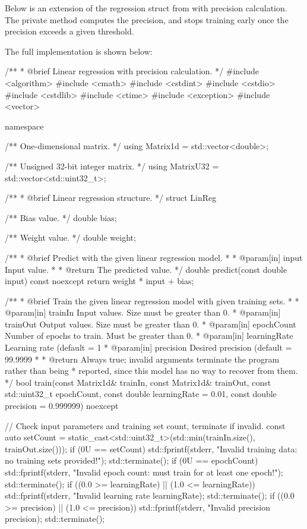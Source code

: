 Below is an extension of the regression struct from  with precision
calculation. The private method  computes the precision, and
 stops training early once the precision exceeds a given threshold.

The full implementation is shown below:

\begin{cppcode}
/**
 * @brief Linear regression with precision calculation.
 */
#include <algorithm>
#include <cmath>
#include <cstdint>
#include <cstdio>
#include <cstdlib>
#include <ctime>
#include <exception>
#include <vector>

namespace
{
/** One-dimensional matrix. */
using Matrix1d = std::vector<double>;

/** Unsigned 32-bit integer matrix. */
using MatrixU32 = std::vector<std::uint32_t>;

/**
 * @brief Linear regression structure.
 */
struct LinReg
{
    /** Bias value. */
    double bias;

    /** Weight value. */
    double weight;

    /**
     * @brief Predict with the given linear regression model.
     *
     * @param[in] input Input value.
     *
     * @return The predicted value.
     */
    double predict(const double input) const noexcept { return weight * input + bias; }

    /**
     * @brief Train the given linear regression model with given training sets.
     *
     * @param[in] trainIn    Input values. Size must be greater than 0.
     * @param[in] trainOut   Output values. Size must be greater than 0.
     * @param[in] epochCount Number of epochs to train. Must be greater than 0.
     * @param[in] learningRate Learning rate (default = 1 %
     * @param[in] precision  Desired precision (default = 99.9999 %
     *
     * @return Always true; invalid arguments terminate the program rather than being
     *         reported, since this model has no way to recover from them.
     */
    bool train(const Matrix1d& trainIn, const Matrix1d& trainOut,
               const std::uint32_t epochCount, const double learningRate = 0.01,
               const double precision = 0.999999) noexcept
    {
        // Check input parameters and training set count, terminate if invalid.
        const auto setCount = static_cast<std::uint32_t>(std::min(trainIn.size(), trainOut.size()));
        if (0U == setCount)
        {
            std::fprintf(stderr, "Invalid training data: no training sets provided!\n");
            std::terminate();
        }
        if (0U == epochCount)
        {
            std::fprintf(stderr, "Invalid epoch count: must train for at least one epoch!\n");
            std::terminate();
        }
        if ((0.0 >= learningRate) || (1.0 <= learningRate))
        {
            std::fprintf(stderr, "Invalid learning rate %
                learningRate);
            std::terminate();
        }
        if ((0.0 >= precision) || (1.0 <= precision))
        {
            std::fprintf(stderr, "Invalid precision %
                precision);
            std::terminate();
        }

}}}
\end{cppcode}
